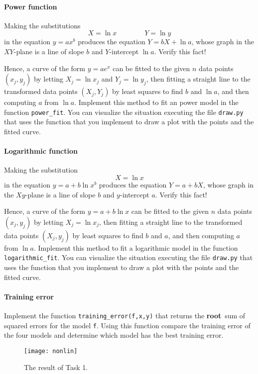 \documentclass[a4paper,10pt]{article}
\begin{document}
\paragraph{Power function}
Making the substitutions \[X=\ln x\qquad \qquad Y=\ln y\] in the
equation $y=ax^b$ produces the equation $Y=bX+\ln a$, whose graph in the
$XY$-plane is a line of slope $b$ and $Y$-intercept $\ln a$. Verify this
fact!

Hence, a curve of the form $y=ae^x$ can be fitted to the given $n$ data
points $(x_j,y_j)$ by letting $X_j=\ln x_j$ and $Y_j=\ln y_j$, then
fitting a straight line to the transformed data points $(X_j,Y_j)$ by
least squares to find $b$ and $\ln a$, and then computing $a$ from $\ln
a$.  Implement this method to fit an power model in the function
\lstinline{power_fit}. You can visualize the situation executing the
file \lstinline{draw.py} that uses the function that you implement to
draw a plot with the points and the fitted curve.


\paragraph{Logarithmic function} Making the substitution \[X=\ln x\]
in the equation $y=a+b\ln x^b$ produces the equation $Y=a+bX$, whose
graph in the $Xy$-plane is a line of slope $b$ and $y$-intercept
$a$. Verify this fact!

Hence, a curve of the form $y=a+b\ln x$ can be fitted to the given $n$ data
points $(x_j,y_j)$ by letting $X_j=\ln x_j$, then fitting a straight
line to the transformed data points $(X_j,y_j)$ by least squares to find
$b$ and $a$, and then computing $a$ from $\ln a$.  Implement this
method to fit a logarithmic model in the function
\lstinline{logarithmic_fit}. You can visualize the situation executing
the file \lstinline{draw.py} that uses the function that you implement
to draw a plot with the points and the fitted curve.


\paragraph{Training error} Implement the function
\lstinline{training_error(f,x,y)} that returns the \color{red}
{\bf root}\color{black}\ sum of squared
  errors for the model \lstinline{f}. Using this function compare the
  training error of the four models and determine which model has the
  best training error.



\begin{figure}[tb]
\centering
\texttt{[image: nonlin]}
\caption{The result of Task 1.}
\end{figure}
\end{document}
